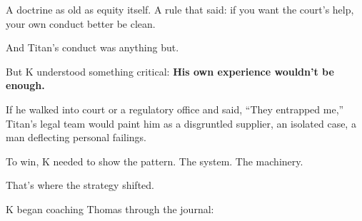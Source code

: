 A doctrine as old as equity itself.
A rule that said: if you want the court’s help, your own conduct better be clean.

And Titan’s conduct was anything but.

But K understood something critical:
\textbf{His own experience wouldn’t be enough.}

If he walked into court or a regulatory office and said,
“They entrapped me,”
Titan’s legal team would paint him as a disgruntled supplier, an isolated case, a man deflecting personal failings.

To win, K needed to show the pattern.
The system.
The machinery.

That’s where the strategy shifted.

K began coaching Thomas through the journal:


